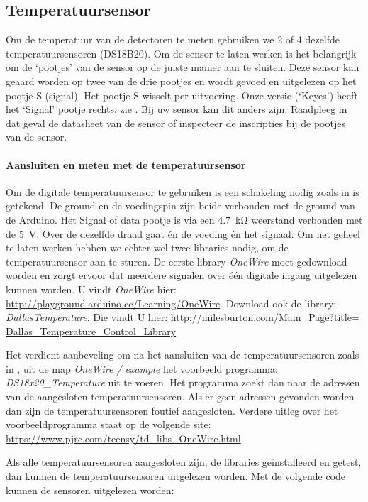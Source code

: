 \subsection{Temperatuursensor}

Om de temperatuur van de detectoren te meten gebruiken we 2 of 4
dezelfde temperatuursensoren (DS18B20). Om de sensor te laten werken is
het belangrijk om de `pootjes' van de sensor op de juiste manier aan te
sluiten. Deze sensor kan geaard worden op twee van de drie pootjes en
wordt gevoed en uitgelezen op het pootje S (signal). Het pootje S
wisselt per uitvoering. Onze versie (`Keyes') heeft het `Signal' pootje
rechts,  zie . Bij uw sensor kan dit anders zijn.
Raadpleeg in dat geval de datasheet van de sensor of inspecteer de
inscripties bij de pootjes van de sensor.

\paragraph{Aansluiten en meten met de temperatuursensor}

Om de digitale temperatuursensor te gebruiken is een schakeling nodig
zoals in  is getekend. De ground en de
voedingspin zijn beide verbonden met de ground van de Arduino. Het
Signal of data pootje is via een \SI{4.7}{\kilo\ohm} weerstand verbonden
met de \SI{5}{\volt}. Over de dezelfde draad gaat én de voeding én het
signaal. Om het geheel te laten werken hebben we echter wel twee
libraries nodig, om de temperatuursensor aan te sturen. De eerste
library \emph{OneWire} moet gedownload worden en zorgt ervoor dat
meerdere signalen over één digitale ingang uitgelezen kunnen worden. U
vindt \emph{OneWire} hier:
\url{http://playground.arduino.cc/Learning/OneWire}. Download ook de
library: \emph{DallasTemperature}. Die vindt U hier:
\url{http://milesburton.com/Main_Page?title=
Dallas_Temperature_Control_Library}

Het verdient aanbeveling om na het aansluiten van de temperatuursensoren
zoals in , uit de map \emph{OneWire /
example} het voorbeeld programma: \emph{DS18x20\_Temperature} uit te
voeren. Het programma zoekt dan naar de adressen van de aangesloten
temperatuursensoren. Als er geen adressen gevonden worden dan zijn de
temperatuursensoren foutief aangesloten. Verdere uitleg over het
voorbeeldprogramma staat op de volgende site:
\url{https://www.pjrc.com/teensy/td_libs_OneWire.html}.

Als alle temperatuursensoren aangesloten zijn, de libraries
geïnstalleerd en getest, dan kunnen de temperatuursensoren
uitgelezen worden. Met de volgende code kunnen de sensoren uitgelezen
worden:


